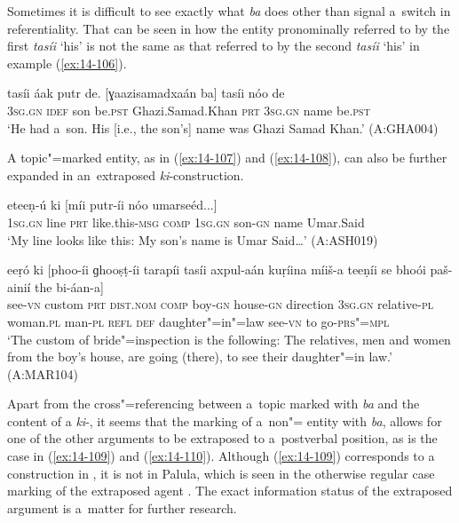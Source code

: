 Sometimes it is difficult to see exactly what \textit{ba} does other than signal a~switch in referentiality. That can be seen in how the entity pronominally referred to by the first \textit{tasíi} `his' is not the same as that referred to by the second \textit{tasíi} `his' in example (\ref{ex:14-106}).

\begin{exe}
\ex
\label{ex:14-106}
\gll tasíi áak putr de. [ɣaazisamadxaán ba]  tasíi nóo de \\
\textsc{3sg.gn} \textsc{idef} son be.\textsc{pst} Ghazi.Samad.Khan \textsc{prt}  \textsc{3sg.gn} name be.\textsc{pst} \\
\glt `He had a~son. His [i.e., the son's] name was Ghazi Samad Khan.' (A:GHA004)
\end{exe}

A topic"=marked entity, as in (\ref{ex:14-107}) and (\ref{ex:14-108}), can also be further expanded in an~extraposed \textit{ki}-construction.

\begin{exe}
\ex
\label{ex:14-107}
 eteeṇ-ú ki [míi putr-íi  nóo umarseéd...] \\
\textsc{1sg.gn} line \textsc{prt} like.this-\textsc{msg } \textsc{comp} \textsc{1sg.gn} son-\textsc{gn}  name Umar.Said \\
\glt `My line looks like this: My son's name is Umar Said{\ldots}' (A:ASH019)

\ex
\label{ex:14-108}
 eeṛó ki [phoo-íi  ɡhooṣṭ-íi tarapíi tasíi
  axpul-aán kuṛíina  míiš-a teeṇíi se bhoói paš-ainií the bi-áan-a] \\
see-\textsc{vn} custom \textsc{prt} \textsc{dist.nom} \textsc{comp} boy-\textsc{gn}  house-\textsc{gn} direction \textsc{3sg.gn} relative-\textsc{pl} woman.\textsc{pl}  man-\textsc{pl} \textsc{refl } \textsc{def} daughter"=in"=law see-\textsc{vn} to go-\textsc{prs"=mpl} \\
\glt `The custom of bride"=inspection is the following: The relatives, men and women from the boy's house, are going (there), to see their daughter"=in law.' (A:MAR104)
\end{exe}

Apart from the cross"=referencing between a~topic marked with \textit{ba} and the content of a \textit{ki}-, it seems that the marking of a~non"= entity with \textit{ba}, allows for one of the other arguments to be extraposed to a~postverbal position, as is the case in (\ref{ex:14-109}) and (\ref{ex:14-110}). Although (\ref{ex:14-109}) corresponds to a~ construction in , it is not  in Palula, which is seen in the otherwise regular  case marking of the extraposed agent . The exact information status of the extraposed argument is a~matter for further research.

